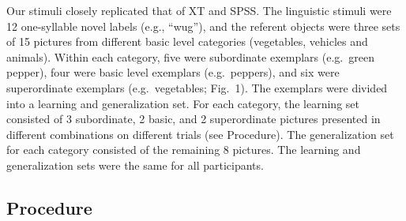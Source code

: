 \documentclass[english,floatsintext,man]{apa6}
\theoremstyle{definition}
\theoremstyle{definition}
\theoremstyle{remark}
\begin{document}
Our stimuli closely replicated that of XT and SPSS. The linguistic
stimuli were 12 one-syllable novel labels (e.g., \enquote{wug}), and the
referent objects were three sets of 15 pictures from different basic
level categories (vegetables, vehicles and animals). Within each
category, five were subordinate exemplars (e.g.~green pepper), four were
basic level exemplars (e.g.~peppers), and six were superordinate
exemplars (e.g.~vegetables; Fig.~1). The exemplars were divided into a
learning and generalization set. For each category, the learning set
consisted of 3 subordinate, 2 basic, and 2 superordinate pictures
presented in different combinations on different trials (see Procedure).
The generalization set for each category consisted of the remaining 8
pictures. The learning and generalization sets were the same for all
participants.

\subsection{Procedure}\label{procedure}
\end{document}
